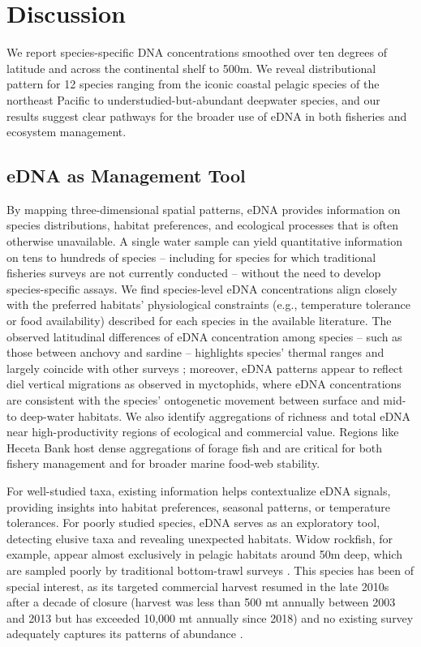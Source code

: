 \documentclass{article}
\begin{document}
\section*{Discussion}
We report species-specific DNA concentrations smoothed over ten degrees of latitude and across the continental shelf to 500m. We reveal distributional pattern for 12 species ranging from the iconic coastal pelagic species of the northeast Pacific to understudied-but-abundant deepwater species, and our results suggest clear pathways for the broader use of eDNA in both fisheries and ecosystem management.

\subsection*{eDNA as Management Tool}
By mapping three-dimensional spatial patterns, eDNA provides information on species distributions, habitat preferences, and ecological processes that is often otherwise unavailable. A single water sample can yield quantitative information on tens to hundreds of species -- including for species for which traditional fisheries surveys are not currently conducted -- without the need to develop species-specific assays. We find species-level eDNA concentrations align closely with the preferred habitats' physiological constraints (e.g., temperature tolerance or food availability) described for each species in the available literature. The observed latitudinal differences of eDNA concentration among species – such as those between anchovy and sardine – highlights species’ thermal ranges and largely coincide with other surveys \cite{zwolinski2024}; moreover, eDNA patterns appear to reflect diel vertical migrations as observed in myctophids, where eDNA concentrations are consistent with the species’ ontogenetic movement between surface and mid- to deep-water habitats. We also identify aggregations of richness and total eDNA near high-productivity regions of ecological and commercial value. Regions like Heceta Bank host dense aggregations of forage fish and are critical for both fishery management and for broader marine food-web stability. 

For well-studied taxa, existing information helps contextualize eDNA signals, providing insights into habitat preferences, seasonal patterns, or temperature tolerances. For poorly studied species, eDNA serves as an exploratory tool, detecting elusive taxa and revealing unexpected habitats. Widow rockfish, for example, appear almost exclusively in pelagic habitats around 50m deep, which are sampled poorly by traditional bottom-trawl surveys \cite{keller2017}. This species has been of special interest, as its targeted commercial harvest resumed in the late 2010s after a decade of closure (harvest was less than 500 mt annually between 2003 and 2013 but has exceeded 10,000 mt annually since 2018) and no existing survey adequately captures its patterns of abundance \cite{adams2019a}.
\end{document}
